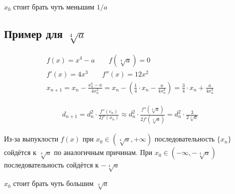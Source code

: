 \quad

$x_0$ стоит брать чуть меньшим $1/a$

\subsection{Пример для $\sqrt[4]{a}$}

\begin{gather}
    f(x) = x^4 - a \qquad f(\sqrt[4]{a}) = 0 \\
    f'(x) = 4x^3 \qquad f''(x) = 12x^2 \\
    x_{n + 1} = x_n - \frac{x_n^4 - a}{4x_n^3} = x_n - \left(\frac{1}{4} \cdot x_n - \frac{a}{4x_n^3}\right) = \frac{3}{4} \cdot x_n + \frac{a}{4 x_n^3}
\end{gather}


\begin{gather}
    d_{n + 1} = d_n^2 \cdot \frac{f''(c_n)}{2f'(x_n)} \approx d_n^2 \cdot \frac{f''(\sqrt[4]{a})}{2f'(\sqrt[4]{a})} = d_n^2 \cdot \frac{3}{2 \sqrt[4]{a}}
\end{gather}

\begin{center}
\end{center}

Из-за выпуклости $f(x)$ при $x_0 \in \left(\sqrt[4]{a}, +\infty\right)$ последовательность $\{x_n\}$ сойдётся к $\sqrt[4]{a}$ по аналогичным причинам.
При $x_0 \in (-\infty, -\sqrt[4]{a})$ последовательность сойдётся к $-\sqrt[4]{a}$

\quad

$x_0$ стоит брать чуть большим $\sqrt[4]{a}$



